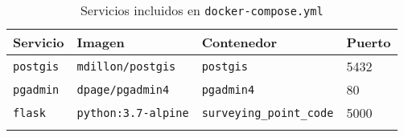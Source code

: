 \begin{longtable}[]{@{}llll@{}}
\toprule
\begin{minipage}[b]{0.18\columnwidth}\raggedright\strut
Servicio\strut
\end{minipage} & \begin{minipage}[b]{0.30\columnwidth}\raggedright\strut
Imagen\strut
\end{minipage} & \begin{minipage}[b]{0.30\columnwidth}\raggedright\strut
Contenedor\strut
\end{minipage} & \begin{minipage}[b]{0.11\columnwidth}\raggedright\strut
Puerto\strut
\end{minipage}\tabularnewline
\midrule
\endhead
\begin{minipage}[t]{0.18\columnwidth}\raggedright\strut
\texttt{postgis}\strut
\end{minipage} & \begin{minipage}[t]{0.30\columnwidth}\raggedright\strut
\texttt{mdillon/postgis}\strut
\end{minipage} & \begin{minipage}[t]{0.30\columnwidth}\raggedright\strut
\texttt{postgis}\strut
\end{minipage} & \begin{minipage}[t]{0.11\columnwidth}\raggedright\strut
5432\strut
\end{minipage}\tabularnewline
\begin{minipage}[t]{0.18\columnwidth}\raggedright\strut
\texttt{pgadmin}\strut
\end{minipage} & \begin{minipage}[t]{0.30\columnwidth}\raggedright\strut
\texttt{dpage/pgadmin4}\strut
\end{minipage} & \begin{minipage}[t]{0.30\columnwidth}\raggedright\strut
\texttt{pgadmin4}\strut
\end{minipage} & \begin{minipage}[t]{0.11\columnwidth}\raggedright\strut
80\strut
\end{minipage}\tabularnewline
\begin{minipage}[t]{0.18\columnwidth}\raggedright\strut
\texttt{flask} \strut
\end{minipage} & \begin{minipage}[t]{0.30\columnwidth}\raggedright\strut
\texttt{python:3.7-alpine}\strut
\end{minipage} & \begin{minipage}[t]{0.30\columnwidth}\raggedright\strut
\texttt{surveying\_point\_code}\strut
\end{minipage} & \begin{minipage}[t]{0.11\columnwidth}\raggedright\strut
5000\strut
\end{minipage}\tabularnewline
\bottomrule
\caption{Servicios incluidos en \texttt{docker-compose.yml}}
\end{longtable}

